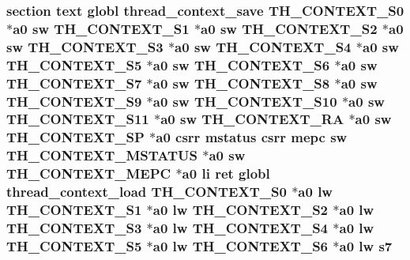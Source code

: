 \hypertarget{riscv_2kpanica_8S_a9c86833e59fb21089c86f13b6404ae8b}{
\subsubsection[{s7}]{\setlength{\rightskip}{0pt plus 5cm}section text globl {\bf thread\-\_\-context\-\_\-save} {\bf T\-H\-\_\-\-C\-O\-N\-T\-E\-X\-T\-\_\-\-S0} $\ast${\bf a0} {\bf sw} {\bf T\-H\-\_\-\-C\-O\-N\-T\-E\-X\-T\-\_\-\-S1} $\ast${\bf a0} {\bf sw} {\bf T\-H\-\_\-\-C\-O\-N\-T\-E\-X\-T\-\_\-\-S2} $\ast${\bf a0} {\bf sw} {\bf T\-H\-\_\-\-C\-O\-N\-T\-E\-X\-T\-\_\-\-S3} $\ast${\bf a0} {\bf sw} {\bf T\-H\-\_\-\-C\-O\-N\-T\-E\-X\-T\-\_\-\-S4} $\ast${\bf a0} {\bf sw} {\bf T\-H\-\_\-\-C\-O\-N\-T\-E\-X\-T\-\_\-\-S5} $\ast${\bf a0} {\bf sw} {\bf T\-H\-\_\-\-C\-O\-N\-T\-E\-X\-T\-\_\-\-S6} $\ast${\bf a0} {\bf sw} {\bf T\-H\-\_\-\-C\-O\-N\-T\-E\-X\-T\-\_\-\-S7} $\ast${\bf a0} {\bf sw} {\bf T\-H\-\_\-\-C\-O\-N\-T\-E\-X\-T\-\_\-\-S8} $\ast${\bf a0} {\bf sw} {\bf T\-H\-\_\-\-C\-O\-N\-T\-E\-X\-T\-\_\-\-S9} $\ast${\bf a0} {\bf sw} {\bf T\-H\-\_\-\-C\-O\-N\-T\-E\-X\-T\-\_\-\-S10} $\ast${\bf a0} {\bf sw} {\bf T\-H\-\_\-\-C\-O\-N\-T\-E\-X\-T\-\_\-\-S11} $\ast${\bf a0} {\bf sw} {\bf T\-H\-\_\-\-C\-O\-N\-T\-E\-X\-T\-\_\-\-R\-A} $\ast${\bf a0} {\bf sw} {\bf T\-H\-\_\-\-C\-O\-N\-T\-E\-X\-T\-\_\-\-S\-P} $\ast${\bf a0} csrr {\bf mstatus} csrr {\bf mepc} {\bf sw} {\bf T\-H\-\_\-\-C\-O\-N\-T\-E\-X\-T\-\_\-\-M\-S\-T\-A\-T\-U\-S} $\ast${\bf a0} {\bf sw} {\bf T\-H\-\_\-\-C\-O\-N\-T\-E\-X\-T\-\_\-\-M\-E\-P\-C} $\ast${\bf a0} {\bf li} ret globl {\bf thread\-\_\-context\-\_\-load} {\bf T\-H\-\_\-\-C\-O\-N\-T\-E\-X\-T\-\_\-\-S0} $\ast${\bf a0} {\bf lw} {\bf T\-H\-\_\-\-C\-O\-N\-T\-E\-X\-T\-\_\-\-S1} $\ast${\bf a0} {\bf lw} {\bf T\-H\-\_\-\-C\-O\-N\-T\-E\-X\-T\-\_\-\-S2} $\ast${\bf a0} {\bf lw} {\bf T\-H\-\_\-\-C\-O\-N\-T\-E\-X\-T\-\_\-\-S3} $\ast${\bf a0} {\bf lw} {\bf T\-H\-\_\-\-C\-O\-N\-T\-E\-X\-T\-\_\-\-S4} $\ast${\bf a0} {\bf lw} {\bf T\-H\-\_\-\-C\-O\-N\-T\-E\-X\-T\-\_\-\-S5} $\ast${\bf a0} {\bf lw} {\bf T\-H\-\_\-\-C\-O\-N\-T\-E\-X\-T\-\_\-\-S6} $\ast${\bf a0} {\bf lw} s7}}\label{riscv_2kpanica_8S_a9c86833e59fb21089c86f13b6404ae8b}

